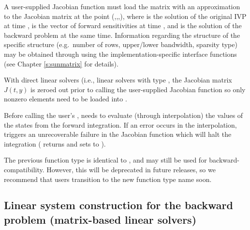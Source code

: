 {
  A user-supplied Jacobian function must load the
  matrix  with an approximation to the Jacobian matrix at the point
  (,,,), where  is the solution of the original
  IVP at time ,  is the vector of forward sensitivities at time ,
  and  is the solution of the backward problem at the same time.
  Information regarding the structure of the specific {\sunmatrix}
  structure (e.g.~number of rows, upper/lower bandwidth, sparsity
  type) may be obtained through using the implementation-specific
  {\sunmatrix} interface functions (see Chapter \ref{s:sunmatrix} for
  details).

  With direct linear solvers (i.e., linear solvers with type
  , the Jacobian matrix $J(t,y)$ is zeroed out prior
  to calling the user-supplied Jacobian function so only nonzero elements need
  to be loaded into .

  {\warn}Before calling the user's , {\cvodes} needs to evaluate
  (through interpolation) the values of the states from the forward integration.
  If an error occurs in the interpolation, {\cvodes} triggers an unrecoverable
  failure in the Jacobian function which will halt the integration
  ( returns  and {\cvls} sets  to
  ).

  The previous function type  is identical to
  , and may still be used for backward-compatibility.
  However, this will be deprecated in future releases, so we recommend
  that users transition to the new function type name soon.
}

\subsection{Linear system construction for the backward problem (matrix-based linear solvers)}
\label{ss:linsysFn_b}

